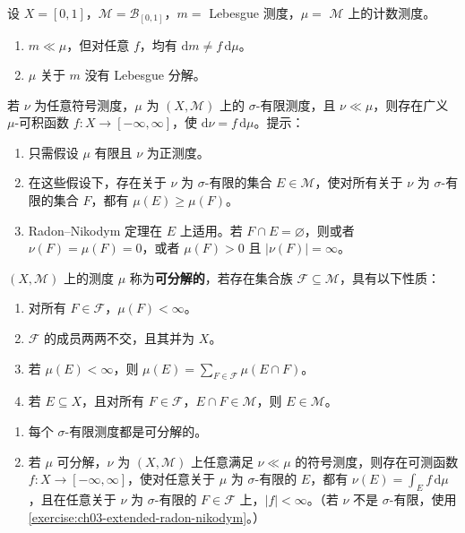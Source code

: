 \documentclass[../../main.tex]{subfiles}%
\begin{document}
\begin{exercise}\label{exercise:ch03-non-sigma-finite-lrn}
设 $X=[0,1]$，$\mathscr{M}=\mathscr{B}_{[0,1]}$，$m=$ Lebesgue 测度，$\mu=$ $\mathscr{M}$ 上的计数测度。
\begin{enumerate}
\item $m\ll\mu$，但对任意 $f$，均有 $\mathrm{d}m\ne f\,\mathrm{d}\mu$。
\item $\mu$ 关于 $m$ 没有 Lebesgue 分解。
\end{enumerate}
\end{exercise}
\begin{exercise}\label{exercise:ch03-extended-radon-nikodym}
若 $\nu$ 为任意符号测度，$\mu$ 为 $(X,\mathscr{M})$ 上的 $\sigma$-有限测度，且 $\nu\ll\mu$，则存在广义 $\mu$-可积函数 $f:X\to[-\infty,\infty]$，使 $\mathrm{d}\nu=f\,\mathrm{d}\mu$。提示：
\begin{enumerate}
\item 只需假设 $\mu$ 有限且 $\nu$ 为正测度。
\item 在这些假设下，存在关于 $\nu$ 为 $\sigma$-有限的集合 $E\in\mathscr{M}$，使对所有关于 $\nu$ 为 $\sigma$-有限的集合 $F$，都有 $\mu(E)\ge\mu(F)$。
\item Radon–Nikodym 定理在 $E$ 上适用。若 $F\cap E=\varnothing$，则或者 $\nu(F)=\mu(F)=0$，或者 $\mu(F)>0$ 且 $|\nu(F)|=\infty$。
\end{enumerate}
\end{exercise}
\begin{exercise}\label{exercise:ch03-decomposable-measure}
\begin{definition*}[可分解测度]
$(X,\mathscr{M})$ 上的测度 $\mu$ 称为\textbf{可分解的}，若存在集合族 $\mathscr{F}\subseteq\mathscr{M}$，具有以下性质：
\begin{enumerate}[label=(\roman*)]
\item 对所有 $F\in\mathscr{F}$，$\mu(F)<\infty$。
\item $\mathscr{F}$ 的成员两两不交，且其并为 $X$。
\item 若 $\mu(E)<\infty$，则 $\mu(E)=\sum_{F\in\mathscr{F}}\mu(E\cap F)$。
\item 若 $E\subseteq X$，且对所有 $F\in\mathscr{F}$，$E\cap F\in\mathscr{M}$，则 $E\in\mathscr{M}$。
\end{enumerate}
\end{definition*}
\begin{enumerate}
\item 每个 $\sigma$-有限测度都是可分解的。
\item 若 $\mu$ 可分解，$\nu$ 为 $(X,\mathscr{M})$ 上任意满足 $\nu\ll\mu$ 的符号测度，则存在可测函数 $f:X\to[-\infty,\infty]$，使对任意关于 $\mu$ 为 $\sigma$-有限的 $E$，都有 $\nu(E)=\int_E f\,\mathrm{d}\mu$，且在任意关于 $\nu$ 为 $\sigma$-有限的 $F\in\mathscr{F}$ 上，$|f|<\infty$。（若 $\nu$ 不是 $\sigma$-有限，使用\cref{exercise:ch03-extended-radon-nikodym}。）
\end{enumerate}
\end{exercise}
\end{document}
